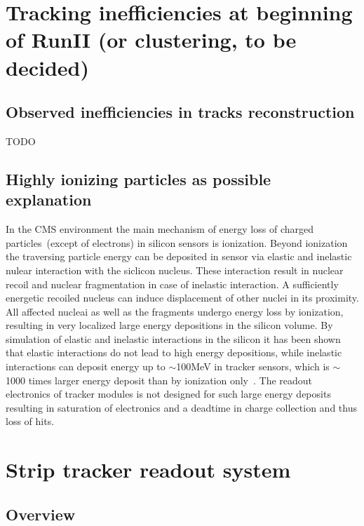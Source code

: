 
\section{Tracking inefficiencies at beginning of RunII (or clustering, to be decided)}

\subsection{Observed inefficiencies in tracks reconstruction}
TODO

\subsection{Highly ionizing particles as possible explanation}

In the CMS environment the main mechanism of energy loss of charged particles~(except of electrons) in silicon sensors is ionization. Beyond ionization the traversing particle energy can be deposited in sensor via elastic and inelastic nulear interaction with the siclicon nucleus. These interaction result in nuclear recoil and nuclear fragmentation in case of inelastic interaction. A sufficiently energetic recoiled nucleus can induce displacement of other nuclei in its proximity. All affected nucleai as well as the fragments undergo energy loss by ionization, resulting in very localized large energy depositions in the silicon volume. By simulation of elastic and inelastic interactions in the silicon it has been shown that elastic interactions do not lead to high energy depositions, while inelastic interactions can deposit energy up to $\sim$100MeV in tracker sensors, which is $\sim$1000 times larger energy deposit than by ionization only~\cite{Huhtinen:2002yda}. The readout electronics of tracker modules is not designed for such large energy deposits resulting in saturation of electronics and a deadtime in charge collection and thus loss of hits.

\section{Strip tracker readout system}

\subsection{Overview}

